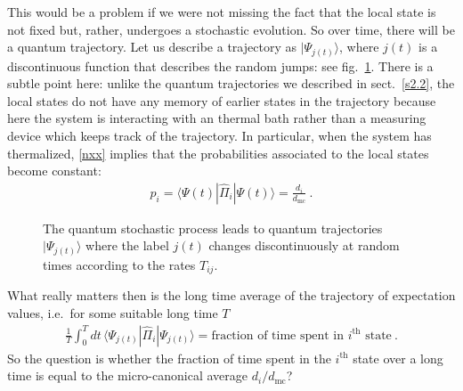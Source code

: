 \documentclass[12pt]{article}
\theoremstyle{plain}
\theoremstyle{definition}
\theoremstyle{remark}
\def\bra#1{\langle #1|}
\def\ket#1{| #1\rangle}
\newcommand{\EQ}[1]{\begin{equation}\begin{split} #1
\end{split}\end{equation}}
\begin{document}
This would be a problem if we were not missing the fact that the local state is not fixed but, rather, undergoes a stochastic evolution. So over time, there will be a quantum trajectory. Let us describe a trajectory as $\ket{\Psi_{j(t)}}$, where $j(t)$ is a discontinuous function that describes the random jumps: see fig.~\ref{f8}. There is a subtle point here: unlike the quantum trajectories we described in sect.~\ref{s2.2}, the local states do not have any memory of earlier states in the trajectory because here the system is interacting with an thermal bath rather than a measuring device which keeps track of the trajectory.
In particular, when the system has thermalized, \eqref{nxx} implies that the probabilities associated to the local states become constant:
\EQ{
p_i=\bra{\Psi(t)}\hat\Pi_i\ket{\Psi(t)}=\frac{d_i}{d_\text{mc}}\ .
}
\begin{figure}[ht]
\begin{center}
\end{center}
\caption{The quantum stochastic process leads to quantum trajectories $\ket{\Psi_{j(t)}}$ where the label $j(t)$ changes discontinuously at random times according to the rates $T_{ij}$.}
\label{f8}
\end{figure}

What really matters then is the long time average of the trajectory of expectation values, i.e.~for some suitable long time $T$
\EQ{
\frac1T\int_0^T dt\,\bra{\Psi_{j(t)}}\hat\Pi_i\ket{\Psi_{j(t)}}=\text{fraction of time spent in }i^\text{th}\text{ state}\ .
\label{uus}
}
So the question is whether the fraction of time spent in the $i^\text{th}$ state over a long time is equal to the micro-canonical average $d_i/d_\text{mc}$? 
\end{document}
